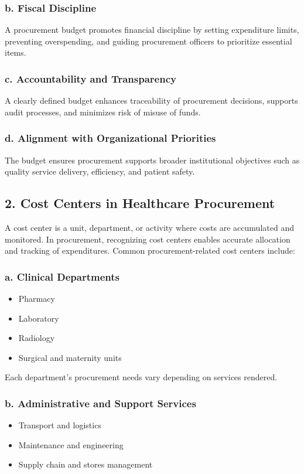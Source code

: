 \documentclass[10pt]{article}
\begin{document}
\subsubsection*{b. Fiscal Discipline}
A procurement budget promotes financial discipline by setting expenditure limits, preventing overspending, and guiding procurement officers to prioritize essential items.

\subsubsection*{c. Accountability and Transparency}
A clearly defined budget enhances traceability of procurement decisions, supports audit processes, and minimizes risk of misuse of funds.

\subsubsection*{d. Alignment with Organizational Priorities}
The budget ensures procurement supports broader institutional objectives such as quality service delivery, efficiency, and patient safety.

\subsection*{2. Cost Centers in Healthcare Procurement}
A cost center is a unit, department, or activity where costs are accumulated and monitored. In procurement, recognizing cost centers enables accurate allocation and tracking of expenditures. Common procurement-related cost centers include:

\subsubsection*{a. Clinical Departments}
\begin{itemize}
  \item Pharmacy
  \item Laboratory
  \item Radiology
  \item Surgical and maternity units
\end{itemize}

Each department's procurement needs vary depending on services rendered.

\subsubsection*{b. Administrative and Support Services}
\begin{itemize}
  \item Transport and logistics
  \item Maintenance and engineering
  \item Supply chain and stores management
\end{itemize}
\end{document}
